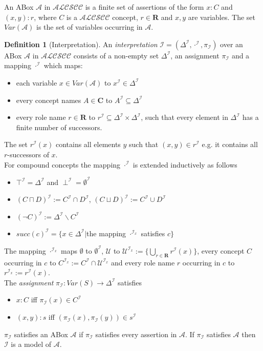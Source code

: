 \documentclass[a4paper,11pt]{scrartcl}
\theoremstyle{break}
\theoremstyle{definition}
\newtheorem{mydef}{Definition}
\begin{document}
An ABox $\mathcal{A}$ in $\mathcal{ALCSCC}$ is a finite set of assertions of the form $x:C$ and $(x,y):r$, where $C$ is a $\mathcal{ALCSCC}$ concept, $r\in\mathbf{R}$ and $x,y$ are variables. The set $Var(\mathcal{A})$ is the set of variables occurring in $\mathcal{A}$. 
\begin{mydef}[Interpretation]
An \textit{interpretation} $\mathcal{I}=(\Delta^\mathcal{I},\cdot^\mathcal{I},\pi_\mathcal{I})$ over an ABox $\mathcal{A}$ in $\mathcal{ALCSCC}$ consists of a non-empty set $\Delta^\mathcal{I}$, an assignment $\pi_\mathcal{I}$ and a mapping $\cdot^\mathcal{I}$ which maps:
\begin{itemize}
\item each variable $x\in Var(\mathcal{A})$ to $x^\mathcal{I}\in \Delta^\mathcal{I}$
\item every concept names $A\in\mathbf{C}$ to $A^\mathcal{I}\subseteq \Delta^\mathcal{I}$
\item every role name $r\in\mathbf{R}$ to $r^\mathcal{I}\subseteq\Delta^\mathcal{I}\times\Delta^\mathcal{I}$, such that every element in $\Delta^\mathcal{I}$ has a finite number of successors.
\end{itemize}
The set $r^\mathcal{I}(x)$ contains all elements $y$ such that $(x,y)\in r^\mathcal{I}$ e.g. it contains all $r$-successors of $x$.\\
For compound concepts the mapping $\cdot^\mathcal{I}$ is extended inductively as follows
\begin{itemize}
\item $\top^\mathcal{I}=\Delta^\mathcal{I}$ and $\perp^\mathcal{I}=\emptyset^\mathcal{I}$
\item $(C\sqcap D)^\mathcal{I}:=C^\mathcal{I}\cap D^\mathcal{I}$, $(C\sqcup D)^\mathcal{I}:=C^\mathcal{I}\cup D^\mathcal{I}$
\item $(\neg C)^\mathcal{I}:=\Delta^\mathcal{I}\backslash C^\mathcal{I}$
\item $succ(c)^\mathcal{I}=\{x\in \Delta^\mathcal{I}|$the mapping $\cdot^{\mathcal{I}_x}$ satisfies $c\}$
\end{itemize}
The mapping $\cdot^{\mathcal{I}_x}$ maps $\emptyset$ to $\emptyset^\mathcal{I}$, $\mathcal{U}$ to $\mathcal{U}^{\mathcal{I}_x}:=\{\bigcup_{r\in\mathbf{R}}r^\mathcal{I}(x)\}$, every concept $C$ occurring in $c$ to $C^{\mathcal{I}_x}:=C^\mathcal{I}\cap \mathcal{U}^{\mathcal{I}_x}$ and every role name $r$ occurring in $c$ to $r^{\mathcal{I}_x}:=r^\mathcal{I}(x)$.\\
The \textit{assignment} $\pi_\mathcal{I}:Var(S)\rightarrow\Delta^\mathcal{I}$ satisfies
\begin{itemize}
\item $x:C$ iff $\pi_\mathcal{I}(x)\in C^\mathcal{I}$ 
\item $(x,y):s$ iff $(\pi_\mathcal{I}(x),\pi_\mathcal{I}(y))\in s^\mathcal{I}$
\end{itemize} 
$\pi_\mathcal{I}$ satisfies an ABox $\mathcal{A}$ if $\pi_\mathcal{I}$ satisfies every assertion in $\mathcal{A}$. If $\pi_\mathcal{I}$ satisfies $\mathcal{A}$ then $\mathcal{I}$ is a model of $\mathcal{A}$.
\end{mydef}
\end{document}
